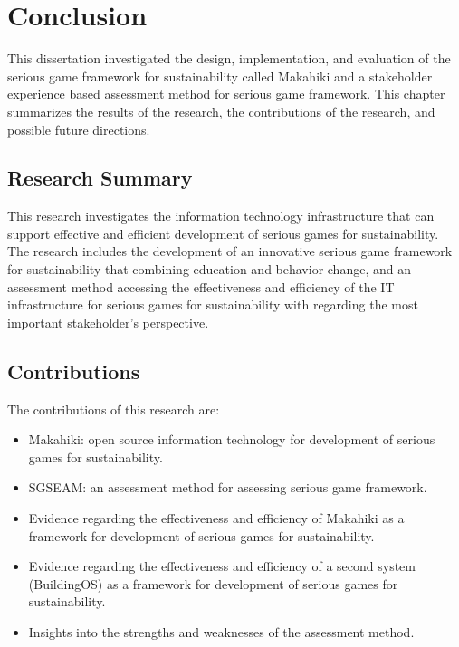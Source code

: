 \chapter{Conclusion}
\label{cha:conclusion}

This dissertation investigated the design, implementation, and evaluation of the serious game framework for sustainability called Makahiki and a stakeholder experience based assessment method for serious game framework. This chapter summarizes the results of the research, the contributions of the research, and possible future directions.

\section{Research Summary}
This research investigates the information technology infrastructure that can support effective and efficient development of serious games for sustainability. The research includes the development of an innovative serious game framework for sustainability that combining education and behavior change, and an assessment method accessing the effectiveness and efficiency of the IT infrastructure for serious games for sustainability with regarding the most important stakeholder's perspective.




\section{Contributions}

The contributions of this research are:


\begin{itemize}
	\item Makahiki: open source information technology for development of serious games for sustainability.
	\item SGSEAM: an assessment method for assessing serious game framework.
	\item Evidence regarding the effectiveness and efficiency of Makahiki as a framework for development of serious games for sustainability.
	\item Evidence regarding the effectiveness and efficiency of a second system (BuildingOS) as a framework for development of serious games for sustainability.
	\item Insights into the strengths and weaknesses of the assessment method.
\end{itemize}

